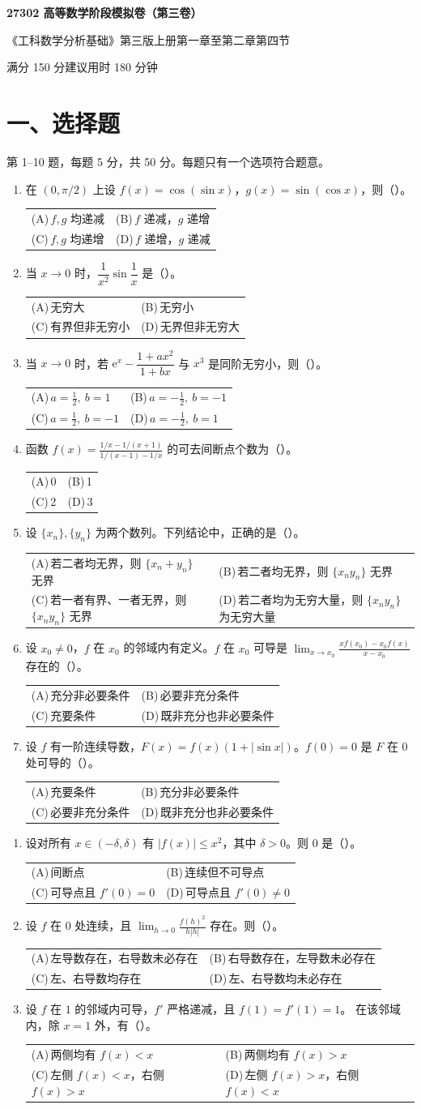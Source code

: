 \documentclass[UTF8,a4paper,zihao=-4,fontset=fandol]{ctexart}
\makeatletter
\newcommand{\choices}[4]{%
  \par\noindent\begin{tabularx}{\linewidth}{@{}X@{\hspace{1em}}X@{}}
    (A)\,#1 & (B)\,#2 \\
    (C)\,#3 & (D)\,#4
  \end{tabularx}\par}
\newcommand{\paper}[1]{%
  \pdfbookmark[0]{第#1卷}{paper.\thepage}%
  \begin{center}
    {\LARGE\bfseries 27302 高等数学阶段模拟卷（第#1卷）\par}
    \small 《工科数学分析基础》第三版上册第一章至第二章第四节\par
    满分 150 分\qquad 建议用时 180 分钟
  \end{center}
  \section*{一、选择题}
  第 1--10 题，每题 5 分，共 50 分。每题只有一个选项符合题意。}
\makeatother
\begin{document}
\newpage
\paper{三}
\begin{enumerate}
\item 在 $(0,\pi/2)$ 上设 $f(x)=\cos(\sin x)$，$g(x)=\sin(\cos x)$，则（\quad）。
\choices{$f,g$ 均递减}{$f$ 递减，$g$ 递增}{$f,g$ 均递增}{$f$ 递增，$g$ 递减}
\item 当 $x\to0$ 时，$\dfrac{1}{x^2}\sin\dfrac1x$ 是（\quad）。
\choices{无穷大}{无穷小}{有界但非无穷小}{无界但非无穷大}
\item 当 $x\to0$ 时，若 $\mathrm{e}^x-\dfrac{1+ax^2}{1+bx}$ 与 $x^3$ 是同阶无穷小，则（\quad）。
\choices{$a=\tfrac12,\ b=1$}{$a=-\tfrac12,\ b=-1$}{$a=\tfrac12,\ b=-1$}{$a=-\tfrac12,\ b=1$}
\item 函数 $\displaystyle f(x)=\frac{1/x-1/(x+1)}{1/(x-1)-1/x}$ 的可去间断点个数为（\quad）。
\choices{0}{1}{2}{3}
\item 设 $\{x_n\},\{y_n\}$ 为两个数列。下列结论中，正确的是（\quad）。
\choices{若二者均无界，则 $\{x_n+y_n\}$ 无界}
{若二者均无界，则 $\{x_ny_n\}$ 无界}
{若一者有界、一者无界，则 $\{x_ny_n\}$ 无界}
{若二者均为无穷大量，则 $\{x_ny_n\}$ 为无穷大量}
\item 设 $x_0\ne0$，$f$ 在 $x_0$ 的邻域内有定义。$f$ 在 $x_0$ 可导是
$\displaystyle\lim_{x\to x_0}\frac{xf(x_0)-x_0f(x)}{x-x_0}$ 存在的（\quad）。
\choices{充分非必要条件}{必要非充分条件}{充要条件}{既非充分也非必要条件}
\item 设 $f$ 有一阶连续导数，$F(x)=f(x)(1+|\sin x|)$。$f(0)=0$ 是 $F$ 在 $0$ 处可导的（\quad）。
\choices{充要条件}{充分非必要条件}{必要非充分条件}{既非充分也非必要条件}
\end{enumerate}
\newpage
\begin{enumerate}[start=8]
\item 设对所有 $x\in(-\delta,\delta)$ 有 $|f(x)|\le x^2$，其中 $\delta>0$。则 $0$ 是（\quad）。
\choices{间断点}{连续但不可导点}{可导点且 $f'(0)=0$}{可导点且 $f'(0)\ne0$}
\item 设 $f$ 在 $0$ 处连续，且 $\displaystyle\lim_{h\to0}\frac{f(h)^2}{h|h|}$ 存在。则（\quad）。
\choices{左导数存在，右导数未必存在}{右导数存在，左导数未必存在}
{左、右导数均存在}{左、右导数均未必存在}
\item 设 $f$ 在 $1$ 的邻域内可导，$f'$ 严格递减，且 $f(1)=f'(1)=1$。
在该邻域内，除 $x=1$ 外，有（\quad）。
\choices{两侧均有 $f(x)<x$}{两侧均有 $f(x)>x$}
{左侧 $f(x)<x$，右侧 $f(x)>x$}{左侧 $f(x)>x$，右侧 $f(x)<x$}
\end{enumerate}
\end{document}
